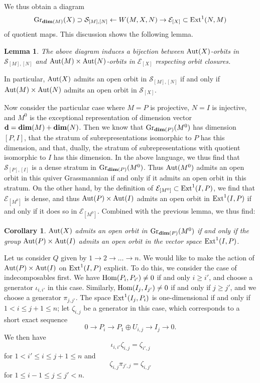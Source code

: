 \documentclass{amsart}
\numberwithin{equation}{section}
\newtheorem{lem}[thm]{Lemma}
\newtheorem{cor}[thm]{Corollary}
\theoremstyle{remark}
\begin{document}
We thus obtain a diagram
$${\rm Gr}_{{\rm\bf dim}(M)}(X)\supset\mathcal{S}_{[M],[N]}\leftarrow W(M,X,N)\rightarrow \mathcal{E}_{[X]}\subset{\rm Ext}^1(N,M)$$
of quotient maps. This discussion shows the following lemma.

\begin{lem} The above diagram induces a bijection between ${\rm Aut}(X)$-orbits in $\mathcal{S}_{[M],[N]}$ and ${\rm Aut}(M)\times{\rm Aut}(N)$-orbits in $\mathcal{E}_{[X]}$ respecting orbit closures.
\end{lem}

In particular, ${\rm Aut}(X)$ admits an open orbit in $\mathcal{S}_{[M],[N]}$ if and only if ${\rm Aut}(M)\times{\rm Aut}(N)$ admits an open orbit in $\mathcal{S}_{[X]}$.

Now consider the particular case where $M=P$ is projective, $N=I$ is injective, and $M^0$ is the exceptional representation of dimension vector ${\bf d}={\rm\bf dim}(M)+{\rm\bf dim}(N)$. Then we know that ${\rm Gr}_{{\rm\bf dim}(P)}(M^0)$ has dimension $[P,I]$, that the stratum of subrepresentations isomorphic to $P$ has this dimension, and that, dually, the stratum of subrepresentations with quotient isomorphic to $I$ has this dimension. In the above language, we thus find that $\mathcal{S}_{[P],[I]}$ is a dense stratum in ${\rm Gr}_{{\rm\bf dim}(P)}(M^0)$. Thus ${\rm Aut}(M^0)$ admits an open orbit in this quiver Grassmannian if and only if it admits an open orbit in this stratum. On the other hand, by the definition of $\mathcal{E}_{[M^0]}\subset{\rm Ext}^1(I,P)$, we find that $\mathcal{E}_{[M^0]}$ is dense, and thus ${\rm Aut}(P)\times{\rm Aut}(I)$ admits an open orbit in ${\rm Ext}^1(I,P)$ if and only if it does so in $\mathcal{E}_{[M^0]}$. Combined with the previous lemma, we thus find:
\begin{cor}\label{cor:Ext(I,P)} 
${\rm Aut}(X)$ admits an open orbit in ${\rm Gr}_{{\rm\bf dim}(P)}(M^0)$ if and only if the group ${\rm Aut}(P)\times{\rm Aut}(I)$ admits an open orbit in the vector space ${\rm Ext}^1(I,P)$.
\end{cor}

Let us consider $Q$ given by $1\rightarrow 2\rightarrow\ldots\rightarrow n$. We would like to make the action of ${\rm Aut}(P)\times{\rm Aut}(I)$ on ${\rm Ext}^1(I,P)$ explicit. To do this, we consider the case of indecomposables first. We have ${\rm Hom}(P_i,P_{i'})\not=0$ if and only $i\geq i'$, and  choose a generator $\iota_{i,i'}$ in this case. Similarly, ${\rm Hom}(I_j,I_{j'})\not=0$ if and only if $j\geq j'$, and we choose a generator $\pi_{j,j'}$. The space ${\rm Ext}^1(I_j,P_i)$ is one-dimensional if and only if $1<i\leq j+1\leq n$; let $\zeta_{i,j}$ be a generator in this case, which corresponds to a short exact sequence
$$0\rightarrow P_i\rightarrow P_1\oplus U_{i,j}\rightarrow I_j\rightarrow 0.$$ We then have
$$\iota_{i,i'}\zeta_{i,j}=\zeta_{i',j}$$
for $1<i'\leq i\leq j+1\leq n$ and
$$\zeta_{i,j}\pi_{j',j}=\zeta_{i,j'}$$
for $1\leq i-1\leq j\leq j'<n$.
\end{document}
